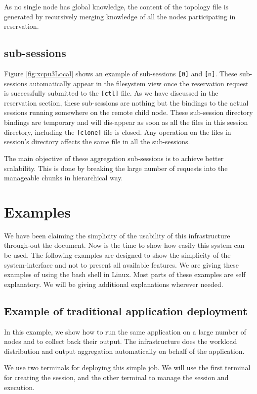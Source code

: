 As no single node has global knowledge, the content of the topology file is
generated by recursively merging knowledge of all the nodes participating in
reservation.

\subsection{sub-sessions}
Figure \ref{fig:xcpu3Local} shows an example of sub-sessions \texttt{[0]} and
\texttt{[n]}. These sub-sessions automatically appear in the filesystem view
once the reservation request is successfully submitted to the \texttt{[ctl]}
file.  As we have discussed in the reservation section, these sub-sessions are
nothing but the bindings to the actual sessions running somewhere on the remote
child node. These sub-session directory bindings are temporary and will
dis-appear as soon as all the files in this session directory, including the
\texttt{[clone]} file is closed.  Any operation on the files in session's
directory affects the same file in all the sub-sessions.

The main objective of these aggregation sub-sessions is to achieve better
scalability.  This is done by breaking the large number of requests into the
manageable chunks in hierarchical way.

\section{Examples}
We have been claiming the simplicity of the usability of this infrastructure
through-out the document.  Now is the time to show how easily this system can
be used.  The following examples are designed to show the simplicity of the
system-interface and not to present all available features.  We are giving these
examples of using the bash shell in Linux.  Most parts of these examples are
self explanatory.  We will be giving additional explanations wherever needed.

\subsection{Example of traditional application deployment}
In this example, we show how to run the same application on a large number
of nodes and to collect back their output.  The infrastructure does the workload
distribution and output aggregation automatically on behalf of the application.

We use two terminals for deploying this simple job.  We will use the first
terminal for creating the session, and the other terminal to manage the session
and execution.


